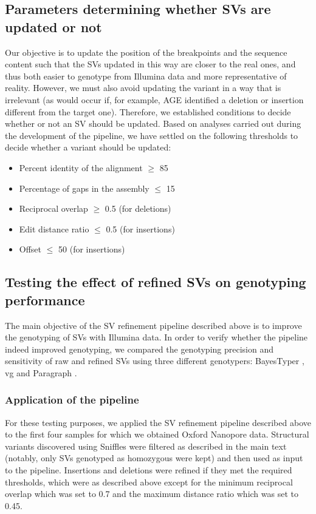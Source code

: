 \documentclass[12pt]{article}
\begin{document}
\subsection{Parameters determining whether SVs are updated or not}

Our objective is to update the position of the breakpoints and the sequence content such that the SVs updated in this way are closer to the real ones, and thus both easier to genotype from Illumina data and more representative of reality.
However, we must also avoid updating the variant in a way that is irrelevant (as would occur if, for example, AGE identified a deletion or insertion different from the target one).
Therefore, we established conditions to decide whether or not an SV should be updated.
Based on analyses carried out during the development of the pipeline, we have settled on the following thresholds to decide whether a variant should be updated:

\begin{itemize}
\item Percent identity of the alignment $\geq$ 85
\item Percentage of gaps in the assembly $\leq$ 15
\item Reciprocal overlap $\geq$ 0.5 (for deletions)
\item Edit distance ratio $\leq$ 0.5 (for insertions)
\item Offset $\leq$ 50 (for insertions)
\end{itemize}

\subsection{Testing the effect of refined SVs on genotyping performance}

The main objective of the SV refinement pipeline described above is to improve the genotyping of SVs with Illumina data.
In order to verify whether the pipeline indeed improved genotyping, we compared the genotyping precision and sensitivity of raw and refined SVs using three different genotypers: BayesTyper \citep{bayestyper}, vg \citep{vg} and Paragraph \citep{paragraph}.

\subsubsection{Application of the pipeline}

For these testing purposes, we applied the SV refinement pipeline described above to the first four samples for which we obtained Oxford Nanopore data.
Structural variants discovered using Sniffles were filtered as described in the main text (notably, only SVs genotyped as homozygous were kept) and then used as input to the pipeline.
Insertions and deletions were refined if they met the required thresholds, which were as described above except for the minimum reciprocal overlap which was set to 0.7 and the maximum distance ratio which was set to 0.45.
\end{document}
